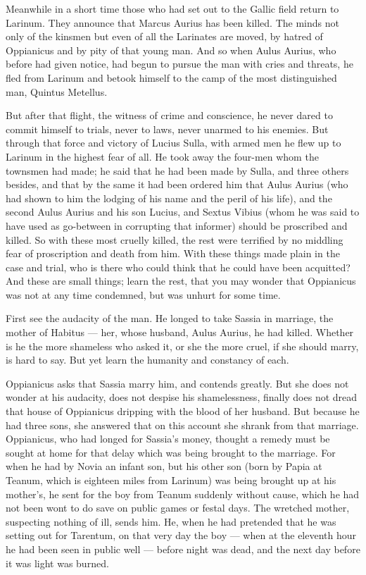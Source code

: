  Meanwhile in a short time those who had set out to the Gallic field return to Larinum. They announce that Marcus Aurius has been killed. The minds not only of the kinsmen but even of all the Larinates are moved, by hatred of Oppianicus and by pity of that young man. And so when Aulus Aurius, who before had given notice, had begun to pursue the man with cries and threats, he fled from Larinum and betook himself to the camp of the most distinguished man, Quintus Metellus.

 But after that flight, the witness of crime and conscience, he never dared to commit himself to trials, never to laws, never unarmed to his enemies. But through that force and victory of Lucius Sulla, with armed men he flew up to Larinum in the highest fear of all. He took away the four-men whom the townsmen had made; he said that he had been made by Sulla, and three others besides, and that by the same it had been ordered him that Aulus Aurius (who had shown to him the lodging of his name and the peril of his life), and the second Aulus Aurius and his son Lucius, and Sextus Vibius (whom he was said to have used as go-between in corrupting that informer) should be proscribed and killed. So with these most cruelly killed, the rest were terrified by no middling fear of proscription and death from him. With these things made plain in the case and trial, who is there who could think that he could have been acquitted? And these are small things; learn the rest, that you may wonder that Oppianicus was not at any time condemned, but was unhurt for some time.

 First see the audacity of the man. He longed to take Sassia in marriage, the mother of Habitus --- her, whose husband, Aulus Aurius, he had killed. Whether is he the more shameless who asked it, or she the more cruel, if she should marry, is hard to say. But yet learn the humanity and constancy of each.

 Oppianicus asks that Sassia marry him, and contends greatly. But she does not wonder at his audacity, does not despise his shamelessness, finally does not dread that house of Oppianicus dripping with the blood of her husband. But because he had three sons, she answered that on this account she shrank from that marriage. Oppianicus, who had longed for Sassia's money, thought a remedy must be sought at home for that delay which was being brought to the marriage. For when he had by Novia an infant son, but his other son (born by Papia at Teanum, which is eighteen miles from Larinum) was being brought up at his mother's, he sent for the boy from Teanum suddenly without cause, which he had not been wont to do save on public games or festal days. The wretched mother, suspecting nothing of ill, sends him. He, when he had pretended that he was setting out for Tarentum, on that very day the boy --- when at the eleventh hour he had been seen in public well --- before night was dead, and the next day before it was light was burned.

